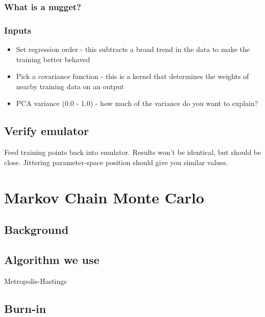 \subsubsection{What is a nugget?}

\subsubsection{Inputs}

\begin{itemize}

\item Set regression order - this subtracts a broad trend in the data to make the training better behaved

\item Pick a covariance function - this is a kernel that determines the weights of nearby training data on an output

\item PCA variance (0.0 - 1.0) - how much of the variance do you want to explain?

\end{itemize}

\subsection{Verify emulator}

Feed training points back into emulator. Results won't be identical, but should be close. Jittering parameter-space position should give you similar values.

\section{Markov Chain Monte Carlo}

\subsection{Background}

\subsection{Algorithm we use}

Metropolis-Hastings

\subsection{Burn-in}

